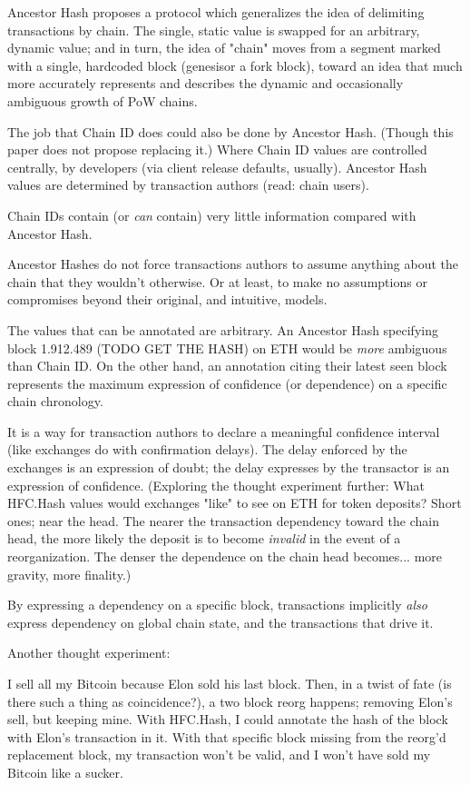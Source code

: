 \documentclass[11pt]{article}
\theoremstyle{plain}
\begin{document}
{Ancestor Hash proposes a protocol which generalizes the idea of delimiting
transactions by chain. The single, static value is swapped for an arbitrary,
dynamic value; and in turn, the idea of "chain" moves from a segment marked
with a single, hardcoded block (genesisor a fork block), toward an idea that
much more accurately represents and describes the dynamic and occasionally
ambiguous growth of PoW chains.

The job that Chain ID does could also be done by Ancestor Hash. (Though this
paper does not propose replacing it.)
Where Chain ID values are controlled centrally, by developers (via client
release defaults, usually). Ancestor Hash values are determined by transaction
authors (read: chain users).

Chain IDs contain (or \textit{can} contain) very little information compared
with Ancestor Hash.

Ancestor Hashes do not force transactions authors to assume anything about the
chain that they wouldn't otherwise. Or at least, to make no assumptions or
compromises beyond their original, and intuitive, models.

The values that can be annotated are arbitrary. An Ancestor Hash specifying
block 1.912.489 (TODO GET THE HASH) on ETH would be \textit{more} ambiguous
than Chain ID. On the other hand, an annotation citing their latest seen block
represents the maximum expression of confidence (or dependence) on a specific
chain chronology.

It is a way for transaction authors to declare a meaningful confidence interval
(like exchanges do with confirmation delays). The delay enforced by the
exchanges is an expression of doubt; the delay expresses by the transactor is
an expression of confidence. (Exploring the thought experiment further: What
HFC.Hash values would exchanges "like" to see on ETH for token deposits? Short
ones; near the head. The nearer the transaction dependency toward the chain
head, the more likely the deposit is to become \textit{invalid} in the event of
a reorganization. The denser the dependence on the chain head becomes... more
gravity, more finality.)

By expressing a dependency on a specific block, transactions implicitly
\textit{also} express dependency on global chain state, and the transactions
that drive it.

Another thought experiment:

I sell all my Bitcoin because Elon sold his last block. Then, in a twist of
fate (is there such a thing as coincidence?), a two block reorg happens;
removing Elon's sell, but keeping mine.
With HFC.Hash, I could annotate the hash of the block with Elon's transaction
in it. With that specific block missing from the reorg'd replacement block, my
transaction won't be valid, and I won't have sold my Bitcoin like a sucker.

}
\end{document}
